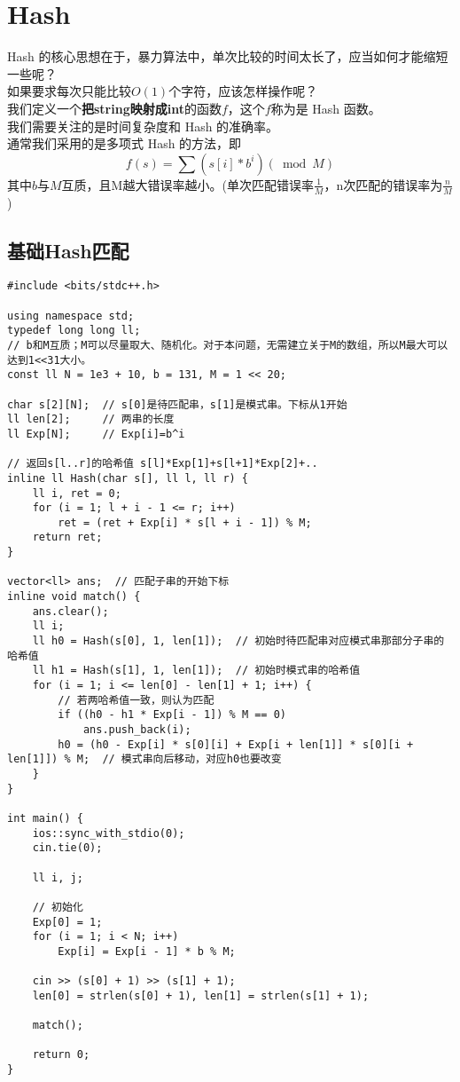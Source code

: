 \section{Hash}
    Hash 的核心思想在于，暴力算法中，单次比较的时间太长了，应当如何才能缩短一些呢？\\
    如果要求每次只能比较$O(1)$个字符，应该怎样操作呢？\\
    我们定义一个\textbf{把string映射成int}的函数$f$，这个$f$称为是 Hash 函数。\\
    我们需要关注的是时间复杂度和 Hash 的准确率。\\
    通常我们采用的是多项式 Hash 的方法，即
    $$f(s)=\sum{(s[i]*b^i)}(\bmod M)$$
    其中$b$与$M$互质，且M越大错误率越小。(单次匹配错误率$\frac{1}{M}$，n次匹配的错误率为$\frac{n}{M}$)

\subsection{基础Hash匹配}
\begin{lstlisting}
#include <bits/stdc++.h>

using namespace std;
typedef long long ll;
// b和M互质；M可以尽量取大、随机化。对于本问题，无需建立关于M的数组，所以M最大可以达到1<<31大小。
const ll N = 1e3 + 10, b = 131, M = 1 << 20;

char s[2][N];  // s[0]是待匹配串，s[1]是模式串。下标从1开始
ll len[2];     // 两串的长度
ll Exp[N];     // Exp[i]=b^i

// 返回s[l..r]的哈希值 s[l]*Exp[1]+s[l+1]*Exp[2]+..
inline ll Hash(char s[], ll l, ll r) {
    ll i, ret = 0;
    for (i = 1; l + i - 1 <= r; i++)
        ret = (ret + Exp[i] * s[l + i - 1]) % M;
    return ret;
}

vector<ll> ans;  // 匹配子串的开始下标
inline void match() {
    ans.clear();
    ll i;
    ll h0 = Hash(s[0], 1, len[1]);  // 初始时待匹配串对应模式串那部分子串的哈希值
    ll h1 = Hash(s[1], 1, len[1]);  // 初始时模式串的哈希值
    for (i = 1; i <= len[0] - len[1] + 1; i++) {
        // 若两哈希值一致，则认为匹配
        if ((h0 - h1 * Exp[i - 1]) % M == 0)
            ans.push_back(i);
        h0 = (h0 - Exp[i] * s[0][i] + Exp[i + len[1]] * s[0][i + len[1]]) % M;  // 模式串向后移动，对应h0也要改变
    }
}

int main() {
    ios::sync_with_stdio(0);
    cin.tie(0);

    ll i, j;

    // 初始化
    Exp[0] = 1;
    for (i = 1; i < N; i++)
        Exp[i] = Exp[i - 1] * b % M;

    cin >> (s[0] + 1) >> (s[1] + 1);
    len[0] = strlen(s[0] + 1), len[1] = strlen(s[1] + 1);

    match();

    return 0;
}
\end{lstlisting}